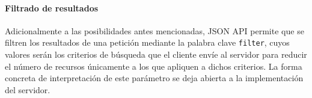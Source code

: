 \paragraph{Filtrado de resultados}

Adicionalmente a las posibilidades antes mencionadas, JSON API permite que se filtren los resultados de una petición mediante la palabra clave \texttt{filter}, cuyos valores serán los criterios de búsqueda que el cliente envíe al servidor para reducir el número de recursos únicamente a los que apliquen a dichos criterios. La forma concreta de interpretación de este parámetro se deja abierta a la implementación del servidor. 
